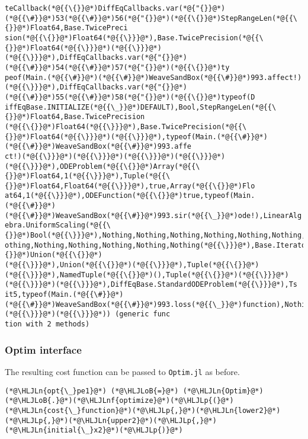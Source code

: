 \documentclass[12pt,a4paper]{article}
\newcommand{\HLJLn}[1]{#1}
\newcommand{\HLJLnf}[1]{\textcolor[RGB]{66,102,213}{#1}}
\newcommand{\HLJLoB}[1]{\textcolor[RGB]{102,102,102}{\textbf{#1}}}
\newcommand{\HLJLp}[1]{#1}
\begin{document}
\begin{lstlisting}
teCallback(*@{{\{}}@*)DiffEqCallbacks.var(*@{"{}}@*)(*@{{\#}}@*)53(*@{{\#}}@*)56(*@{"{}}@*)(*@{{\{}}@*)StepRangeLen(*@{{\{}}@*)Float64,Base.TwicePreci
sion(*@{{\{}}@*)Float64(*@{{\}}}@*),Base.TwicePrecision(*@{{\{}}@*)Float64(*@{{\}}}@*)(*@{{\}}}@*)(*@{{\}}}@*),DiffEqCallbacks.var(*@{"{}}@*)(*@{{\#}}@*)54(*@{{\#}}@*)57(*@{"{}}@*)(*@{{\{}}@*)ty
peof(Main.(*@{{\#}}@*)(*@{{\#}}@*)WeaveSandBox(*@{{\#}}@*)993.affect!)(*@{{\}}}@*),DiffEqCallbacks.var(*@{"{}}@*)(*@{{\#}}@*)55(*@{{\#}}@*)58(*@{"{}}@*)(*@{{\{}}@*)typeof(D
iffEqBase.INITIALIZE(*@{{\_}}@*)DEFAULT),Bool,StepRangeLen(*@{{\{}}@*)Float64,Base.TwicePrecision
(*@{{\{}}@*)Float64(*@{{\}}}@*),Base.TwicePrecision(*@{{\{}}@*)Float64(*@{{\}}}@*)(*@{{\}}}@*),typeof(Main.(*@{{\#}}@*)(*@{{\#}}@*)WeaveSandBox(*@{{\#}}@*)993.affe
ct!)(*@{{\}}}@*)(*@{{\}}}@*)(*@{{\}}}@*)(*@{{\}}}@*)(*@{{\}}}@*),ODEProblem(*@{{\{}}@*)Array(*@{{\{}}@*)Float64,1(*@{{\}}}@*),Tuple(*@{{\{}}@*)Float64,Float64(*@{{\}}}@*),true,Array(*@{{\{}}@*)Flo
at64,1(*@{{\}}}@*),ODEFunction(*@{{\{}}@*)true,typeof(Main.(*@{{\#}}@*)(*@{{\#}}@*)WeaveSandBox(*@{{\#}}@*)993.sir(*@{{\_}}@*)ode!),LinearAlg
ebra.UniformScaling(*@{{\{}}@*)Bool(*@{{\}}}@*),Nothing,Nothing,Nothing,Nothing,Nothing,Nothing,N
othing,Nothing,Nothing,Nothing,Nothing,Nothing(*@{{\}}}@*),Base.Iterators.Pairs(*@{{\{}}@*)Union(*@{{\{}}@*)
(*@{{\}}}@*),Union(*@{{\{}}@*)(*@{{\}}}@*),Tuple(*@{{\{}}@*)(*@{{\}}}@*),NamedTuple(*@{{\{}}@*)(),Tuple(*@{{\{}}@*)(*@{{\}}}@*)(*@{{\}}}@*)(*@{{\}}}@*),DiffEqBase.StandardODEProblem(*@{{\}}}@*),Ts
it5,typeof(Main.(*@{{\#}}@*)(*@{{\#}}@*)WeaveSandBox(*@{{\#}}@*)993.loss(*@{{\_}}@*)function),Nothing(*@{{\}}}@*)(*@{{\}}}@*)(*@{{\}}}@*)) (generic func
tion with 2 methods)
\end{lstlisting}


\subsubsection{Optim interface}
The resulting cost function can be passed to \texttt{Optim.jl} as before.


\begin{lstlisting}
(*@\HLJLn{opt{\_}pe1}@*) (*@\HLJLoB{=}@*) (*@\HLJLn{Optim}@*)(*@\HLJLoB{.}@*)(*@\HLJLnf{optimize}@*)(*@\HLJLp{(}@*)(*@\HLJLn{cost{\_}function}@*)(*@\HLJLp{,}@*)(*@\HLJLn{lower2}@*)(*@\HLJLp{,}@*)(*@\HLJLn{upper2}@*)(*@\HLJLp{,}@*)(*@\HLJLn{initial{\_}x2}@*)(*@\HLJLp{)}@*)
\end{lstlisting}
\end{document}
